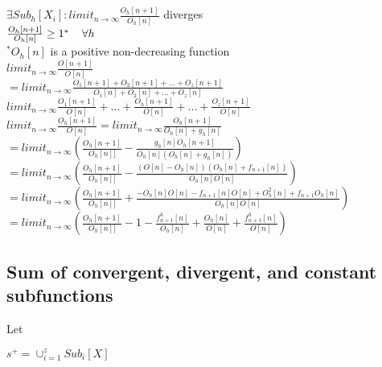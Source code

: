 \documentclass[11pt]{article}
\begin{document}
\begin{center}
$
\exists Sub_h[X_i]: limit_{n \rightarrow \infty} \frac{O_h[n+1]}{O_h[n]}$ diverges
\\ \vspace{8mm}
$
\frac{O_h[n+1]}{O_h[n]} \geq 1^* \hspace{4mm} \forall h
$
\\ \vspace{2mm}
$^* O_h[n]$ is a positive non-decreasing function
\\ \vspace{6mm}
$
limit_{n \rightarrow \infty} \frac{O[n+1]}{O[n]}
$
\\ \vspace{2mm}
$
= limit_{n \rightarrow \infty} \frac{O_{1}[n+1] + O_{2}[n+1] + ... + O_{z}[n+1]}{O_{1}[n] + O_{2}[n] + ... + O_{z}[n]}
$
\\ \vspace{2mm}
$
limit_{n \rightarrow \infty} \frac{O_{1}[n+1]}{O[n]} + ... + \frac{O_{h}[n+1]}{O[n]} +  ... + \frac{O_{z}[n+1]}{O[n]}
$
\\ \vspace{8mm}
$
limit_{n \rightarrow \infty} \frac{O_{h}[n+1]}{O[n]} = limit_{n \rightarrow \infty} \frac{O_{h}[n+1]}{O_h[n] + g_h[n]} 
$
\\ \vspace{2mm}
$
= limit_{n \rightarrow \infty} (\frac{O_{h}[n+1]}{O_h[n]]} - \frac{g_h[n]O_h[n+1]}{O_h[n](O_h[n] + g_h[n])})
$
\\ \vspace{2mm}
$
= limit_{n \rightarrow \infty} (\frac{O_{h}[n+1]}{O_h[n]]} - \frac{(O[n] - O_h[n])(O_h[n] + f_{n+1}[n])}{O_h[n]O[n]})
$
\\ \vspace{2mm}
$
= limit_{n \rightarrow \infty} (\frac{O_{h}[n+1]}{O_h[n]]} + \frac{-O_h[n]O[n]-f_{n+1}[n]O[n]+O_h^2[n]+f_{n+1}O_h[n]}{O_h[n]O[n]})
$
\\ \vspace{2mm}
$
= limit_{n \rightarrow \infty} (\frac{O_{h}[n+1]}{O_h[n]]} - 1 - \frac{f^h_{n+1}[n]}{O_h[n]} + \frac{O_h[n]}{O[n]} + \frac{f^h_{n+1}[n]}{O[n]})
$
\end{center}








\subsection{Sum of convergent, divergent, and constant subfunctions}
Let
\begin{center}
$
s^+ = \cup_{i=1}^z Sub_i[X]
$
\end{center}
\end{document}
